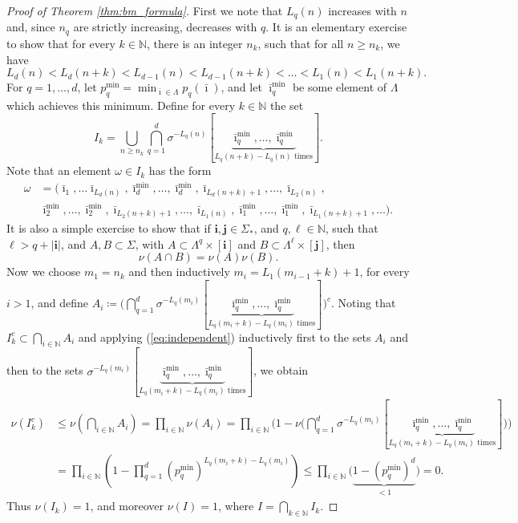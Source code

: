 \documentclass{PRM}
\newcommand{\field}[1]{\mathbb{#1}}
\newcommand{\N}{\field{N}}
\theoremstyle{plain}
\theoremstyle{definition}
\theoremstyle{remark}
\begin{document}
\begin{proof}[Proof of Theorem \ref{thm:bm_formula}]
First we note that $L_q(n)$ increases with $n$ and, since $n_q$ are strictly increasing, decreases with $q$. It is an elementary exercise to show that for every $k\in\N$, there is an integer $n_k$, such that for all $n\geq n_k$, we have
\begin{equation*}
    L_d(n)< L_d(n+k)<L_{d-1}(n)<L_{d-1}(n+k)<\ldots<L_1(n)<L_1(n+k).
\end{equation*}
For $q=1,\ldots,d$, let $p_q^{\min}=\min_{\bar{\imath}\in\Lambda}p_q(\bar{\imath})$, and let $\bar{\imath}_q^{\min}$ be some element of $\Lambda$ which achieves this minimum. Define for every $k\in\N$ the set
\begin{equation*}
    I_k=\bigcup_{n\geq n_k}\bigcap_{q=1}^{d}\sigma^{-L_q(n)}[\underbrace{\bar{\imath}_q^{\min},\ldots,\bar{\imath}_q^{\min}}_{L_q(n+k)-L_q(n)\text{ times}}].
\end{equation*}
Note that an element $\omega\in I_k$ has the form
\begin{align}
    \omega&=(\bar{\imath}_1,\ldots \bar{\imath}_{L_d(n)},\bar{\imath}_d^{\min},\ldots,\bar{\imath}_d^{\min},\bar{\imath}_{L_d(n+k)+1},\ldots,\bar{\imath}_{L_{2}(n)},\label{eq:omegaform}\\
    &\bar{\imath}_2^{\min},\ldots,\bar{\imath}_2^{\min}, \bar{\imath}_{L_2(n+k)+1},\ldots,\bar{\imath}_{L_1(n)},\bar{\imath}_1^{\min},\ldots,\bar{\imath}_1^{\min},\bar{\imath}_{L_1(n+k)+1},\ldots).\nonumber
\end{align}
It is also a simple exercise to show that if $\mathbf{i},\mathbf{j}\in\Sigma_*$, and $q,\ell\in \N$, such that $\ell > q+|\mathbf{i}|$, and $A,B\subset \Sigma$, with $A\subset \Lambda^q\times[\mathbf{i}]$ and $B\subset \Lambda^{\ell}\times[\mathbf{j}]$, then
\begin{equation}\label{eq:independent}
    \nu(A\cap B)=\nu(A)\nu(B).
\end{equation}
Now we choose $m_1=n_k$ and then inductively $m_i=L_1(m_{i-1}+k)+1$, for every $i>1$, and define $A_i\coloneqq\big(\bigcap_{q=1}^{d}\sigma^{-L_q(m_i)}[\underbrace{\bar{\imath}_q^{\min},\ldots,\bar{\imath}_q^{\min}}_{L_q(m_i+k)-L_q(m_i)\text{ times}}]\big)^c$. Noting that $I_k^c\subset\bigcap_{i\in\N}A_i$ and applying (\ref{eq:independent}) inductively first to the sets $A_i$ and then to the sets $\sigma^{-L_q(m_i)}[\underbrace{\bar{\imath}_q^{\min},\ldots,\bar{\imath}_q^{\min}}_{L_q(m_i+k)-L_q(m_i)\text{ times}}]$, we obtain
\begin{align*}
    \nu(I_k^c)&\leq\nu\left(\bigcap_{i\in\N}A_i\right)= \prod_{i\in\N}\nu(A_i)=\prod_{i\in\N}\Bigg(1-\nu\bigg(\bigcap_{q=1}^{d}\sigma^{-L_q(m_i)}[\underbrace{\bar{\imath}_q^{\min},\ldots,\bar{\imath}_q^{\min}}_{L_q(m_i+k)-L_q(m_i)\text{ times}}]\bigg)\Bigg)\\
    &=\prod_{i\in\N}\left(1-\prod_{q=1}^{d}(p_q^{\min})^{L_q(m_i+k)-L_q(m_i)}\right)\leq \prod_{i\in\N}\Bigg(\underbrace{1-(p_q^{\min})^d}_{<1}\Bigg)=0.
\end{align*}
Thus $\nu(I_k)=1$, and moreover
$\nu(I)=1$, where $I=\bigcap_{k\in\N}I_k$.


\end{proof}
\end{document}
